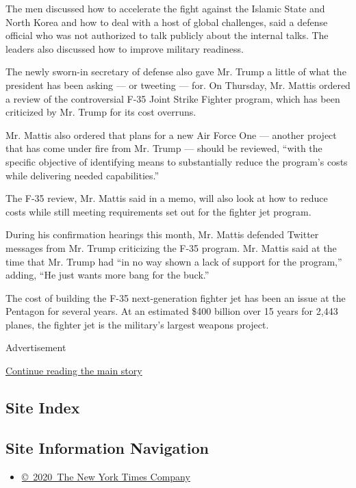 The men discussed how to accelerate the fight against the Islamic State
and North Korea and how to deal with a host of global challenges, said a
defense official who was not authorized to talk publicly about the
internal talks. The leaders also discussed how to improve military
readiness.

The newly sworn-in secretary of defense also gave Mr. Trump a little of
what the president has been asking --- or tweeting --- for. On Thursday,
Mr. Mattis ordered a review of the controversial F-35 Joint Strike
Fighter program, which has been criticized by Mr. Trump for its cost
overruns.

Mr. Mattis also ordered that plans for a new Air Force One --- another
project that has come under fire from Mr. Trump --- should be reviewed,
``with the specific objective of identifying means to substantially
reduce the program's costs while delivering needed capabilities.''

The F-35 review, Mr. Mattis said in a memo, will also look at how to
reduce costs while still meeting requirements set out for the fighter
jet program.

During his confirmation hearings this month, Mr. Mattis defended Twitter
messages from Mr. Trump criticizing the F-35 program. Mr. Mattis said at
the time that Mr. Trump had ``in no way shown a lack of support for the
program,'' adding, ``He just wants more bang for the buck.''

The cost of building the F-35 next-generation fighter jet has been an
issue at the Pentagon for several years. At an estimated \$400 billion
over 15 years for 2,443 planes, the fighter jet is the military's
largest weapons project.

Advertisement

\protect\hyperlink{after-bottom}{Continue reading the main story}

\hypertarget{site-index}{%
\subsection{Site Index}\label{site-index}}

\hypertarget{site-information-navigation}{%
\subsection{Site Information
Navigation}\label{site-information-navigation}}

\begin{itemize}
\tightlist
\item
  \href{https://help.nytimes.com/hc/en-us/articles/115014792127-Copyright-notice}{©~2020~The
  New York Times Company}
\end{itemize}

